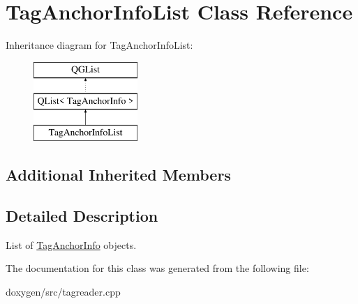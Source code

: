 \hypertarget{class_tag_anchor_info_list}{}\section{Tag\+Anchor\+Info\+List Class Reference}
\label{class_tag_anchor_info_list}
Inheritance diagram for Tag\+Anchor\+Info\+List\+:\begin{figure}[H]
\begin{center}
\leavevmode
\includegraphics[height=3.000000cm]{class_tag_anchor_info_list}
\end{center}
\end{figure}
\subsection*{Additional Inherited Members}


\subsection{Detailed Description}
List of \mbox{\hyperlink{class_tag_anchor_info}{Tag\+Anchor\+Info}} objects. 

The documentation for this class was generated from the following file\+:\begin{DoxyCompactItemize}
\item 
doxygen/src/tagreader.\+cpp\end{DoxyCompactItemize}
